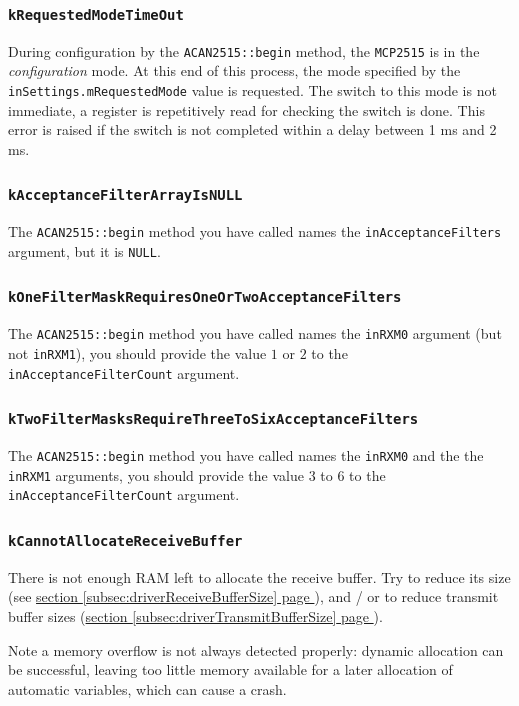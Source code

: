 \documentclass[10pt, a4paper, obeyspaces]{extarticle}
\newcommand\refSubsectionPage[1]{\hyperref[subsec:#1]{section \ref*{subsec:#1} page \pageref{subsec:#1}}}
\newcommand \subsubsectionLabel[2]{\subsubsection{#1}\label{subsubsec:#2}}
\begin{document}
\subsubsectionLabel{\texttt{kRequestedModeTimeOut}}{kRequestedModeTimeOut}

During configuration by the \texttt{ACAN2515::begin} method, the  \texttt{MCP2515} is in the \emph{configuration} mode. At this end of this process, the mode specified by the \texttt{inSettings.mRequestedMode} value is requested. The switch to this mode is not immediate, a register is repetitively read for checking the switch is done. This error is raised if the switch is not completed within a delay between 1 ms and 2 ms.






\subsubsectionLabel{\texttt{kAcceptanceFilterArrayIsNULL}}{kAcceptanceFilterArrayIsNULL}

The \texttt{ACAN2515::begin} method you have called names the \texttt{inAcceptanceFilters} argument, but it is \texttt{NULL}.






\subsubsectionLabel{\texttt{kOneFilterMaskRequiresOneOrTwoAcceptanceFilters}}{kOneFilterMaskRequiresOneOrTwoAcceptanceFilters}

The \texttt{ACAN2515::begin} method you have called names the \texttt{inRXM0} argument (but not \texttt{inRXM1}), you should provide the value $1$ or $2$ to the \texttt{inAcceptanceFilterCount} argument.







\subsubsectionLabel{\texttt{kTwoFilterMasksRequireThreeToSixAcceptanceFilters}}{kTwoFilterMasksRequireThreeToSixAcceptanceFilters}

The \texttt{ACAN2515::begin} method you have called names the \texttt{inRXM0} and the the \texttt{inRXM1} arguments, you should provide the value $3$ to $6$ to the \texttt{inAcceptanceFilterCount} argument.



\subsubsectionLabel{\texttt{kCannotAllocateReceiveBuffer}}{kCannotAllocateReceiveBuffer}

There is not enough RAM left to allocate the receive buffer. Try to reduce its size (see \refSubsectionPage{driverReceiveBufferSize}), and / or to reduce transmit buffer sizes (\refSubsectionPage{driverTransmitBufferSize}).

Note a memory overflow is not always detected properly: dynamic allocation can be successful, leaving too little memory available for a later allocation of automatic variables, which can cause a crash.
\end{document}
